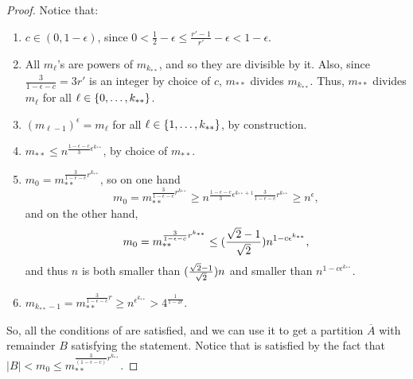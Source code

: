 \begin{theorem}
\begin{proof}
                Notice that:
                \begin{enumerate}[label={\roman*}., ref={\roman*}, font=\rmfamily]
                    \item $c \in (0, 1 - \epsilon)$, since $0 < \frac{1}{2} - \epsilon \leq \frac{r'-1}{r'} - \epsilon < 1 - \epsilon$.
                    \item All $m_\ell$'s are powers of $m_{k_{**}}$, and so they are divisible by it.
                        Also, since $\frac{3}{1-\epsilon-c} = 3r'$ is an integer
                        by choice of $c$, $m_{**}$ divides $m_{k_{**}}$.
                        Thus, $m_{**}$ divides $m_\ell$ for all $\ell \in \{ 0, \dots, k_{**} \}$.
                    \item $(m_{\ell-1})^\epsilon = m_\ell$ for all $\ell \in \{ 1, \dots, k_{**} \}$, by construction.
                    \item $m_{**} \leq n^{\frac{1-\epsilon-c}{3}\epsilon^{k_{**}}}$, by choice of $m_{**}$.
                    \item $m_0 = m_{**}^{\frac{3}{1-\epsilon-c}r^{k_{**}}}$, so on one hand
                        \[
                            m_0 = m_{**}^{\frac{3}{1-\epsilon-c}r^{k_{**}}} \geq n^{\frac{1-\epsilon-c}{3}\epsilon^{k_{**}+1} \frac{3}{1-\epsilon-c}r^{k_{**}}}
                                \geq n^{\epsilon},
                        \]
                        and on the other hand,
                        \[
                            m_0 = m_{**}^{\frac{3}{1-\epsilon-c}r^{k_{**}}} \leq ( \frac{\sqrt{2}-1}{\sqrt{2}} ) n^{1 - c \epsilon^{k_{**}}},
                        \]
                        and thus $n$ is both smaller than $( \frac{\sqrt{2}-1}{\sqrt{2}} ) n$ and
                        smaller than $n^{1 - c \epsilon^{k_{**}}}$.
                    \item $m_{k_{**}-1} = m_{**}^{\frac{3}{1-\epsilon-c}r} \geq n^{\epsilon^{k_{**}}} > 4^{\frac{1}{1-2\epsilon}}$.
                \end{enumerate}
                So, all the conditions of  are satisfied,
                and we can use it to get a partition $\overline{A}$ with remainder $B$ satisfying the statement.
                Notice that 
                is satisfied by the fact that $|B| < m_0 \leq m_{**}^{\frac{3}{(1-\epsilon-c)}r^{k_{**}}}$.
            \end{proof}
        \end{theorem}

